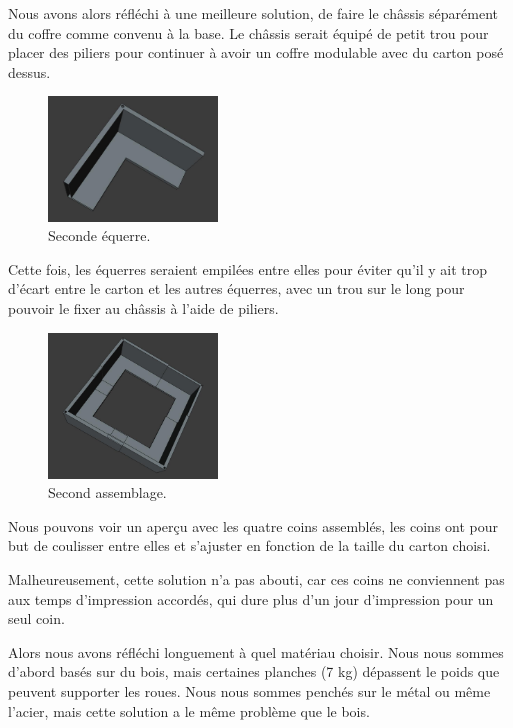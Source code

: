 \documentclass[a4paper,12pt]{report}  %
\begin{document}
Nous avons alors réfléchi à une meilleure solution, de faire le châssis séparément du coffre comme convenu à la base. Le châssis serait équipé de petit trou pour placer des piliers pour continuer à avoir un coffre modulable avec du carton posé dessus. 

\begin{figure}[H]
	\centering
	\includegraphics[width=0.4\textwidth]{./attachments/cad_equerre_v2.jpg}
	\caption{Seconde équerre.}
\end{figure}

Cette fois, les équerres seraient empilées entre elles pour éviter qu’il y ait trop d’écart entre le carton et les autres équerres, avec un trou sur le long pour pouvoir le fixer au châssis à l’aide de piliers.

\begin{figure}[H]
	\centering
	\includegraphics[width=0.4\textwidth]{./attachments/cad_assemblage_v2.jpg}
	\caption{Second assemblage.}
\end{figure}

Nous pouvons voir un aperçu avec les quatre coins assemblés, les coins ont pour but de coulisser entre elles et s’ajuster en fonction de la taille du carton choisi.

Malheureusement, cette solution n’a pas abouti, car ces coins ne conviennent pas aux temps d’impression accordés, qui dure plus d’un jour d’impression pour un seul coin.

Alors nous avons réfléchi longuement à quel matériau choisir. Nous nous sommes d’abord basés sur du bois, mais certaines planches (7 kg) dépassent le poids que peuvent supporter les roues. Nous nous sommes penchés sur le métal ou même l’acier, mais cette solution a le même problème que le bois. 
\end{document}
